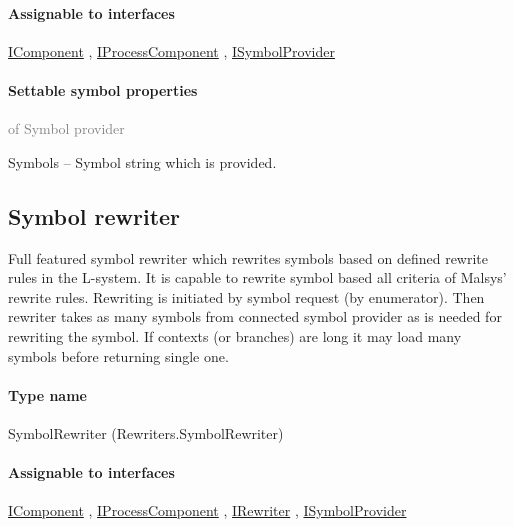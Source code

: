 	\paragraph{Assignable to interfaces}
		\hyperref[Malsys.Processing.Components.IComponent]{IComponent}%
, 		\hyperref[Malsys.Processing.Components.IProcessComponent]{IProcessComponent}%
, 		\hyperref[Malsys.Processing.Components.ISymbolProvider]{ISymbolProvider}%
	\paragraph{Settable symbol properties}\textcolor{gray}{of Symbol provider}
	\begin{description*}
		\item[Symbols]
			-- Symbol string which is provided.
	\end{description*}
	


\subsection{Symbol rewriter}
\label{Malsys.Processing.Components.Rewriters.SymbolRewriter}
Full featured symbol rewriter which rewrites symbols based on defined rewrite rules in the L-system.
             It is capable to rewrite symbol based all criteria of Malsys' rewrite rules.
             Rewriting is initiated by symbol request (by enumerator).
             Then rewriter takes as many symbols from connected symbol provider as is needed for rewriting the symbol.
             If contexts (or branches) are long it may load many symbols before returning single one.\paragraph{Type name}
SymbolRewriter (Rewriters.SymbolRewriter) 	\paragraph{Assignable to interfaces}
		\hyperref[Malsys.Processing.Components.IComponent]{IComponent}%
, 		\hyperref[Malsys.Processing.Components.IProcessComponent]{IProcessComponent}%
, 		\hyperref[Malsys.Processing.Components.IRewriter]{IRewriter}%
, 		\hyperref[Malsys.Processing.Components.ISymbolProvider]{ISymbolProvider}%
